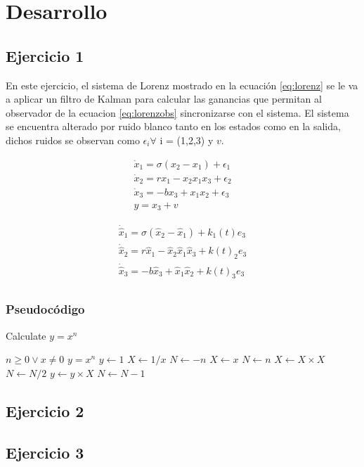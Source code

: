 \section*{Desarrollo}
\subsection*{Ejercicio 1}
En este ejercicio, el sistema de Lorenz mostrado en la ecuación \ref{eq:lorenz} se le va a aplicar un filtro de Kalman para calcular las ganancias que permitan al observador de la ecuacion \ref{eq:lorenzobs} sincronizarse con el sistema. El sistema se encuentra alterado por ruido blanco tanto en los estados como en la salida, dichos ruidos se observan como $\epsilon_i \forall$ i = (1,2,3) y $v$.

\begin{equation}\label{eq:lorenz}
\begin{array}{c}
\dot{x}_1 = \sigma ( x_2 - x_1 ) + \epsilon_1\\
\dot{x}_2 = rx_1 - x_2 x_1x_3 + \epsilon_2\\
\dot{x}_3 = -bx_3 + x_1x_2 + \epsilon_3\\
y = x_3 + v
\end{array}
\end{equation}

\begin{equation}\label{eq:lorenzobs}
\begin{array}{c}
\dot{\hat{x}}_1 = \sigma ( \hat{x}_2 - \hat{x}_1 ) + k_1(t)e_3\\
\dot{\hat{x}}_2 = r\hat{x}_1 - \hat{x}_2 \hat{x}_1\hat{x}_3 + k(t)_2e_3\\
\dot{\hat{x}}_3 = -b\hat{x}_3 + \hat{x}_1\hat{x}_2 + k(t)_3e_3\\
\end{array}
\end{equation}



\subsubsection*{Pseudocódigo}

\begin{algorithm}[H]
	\caption{Calculate $y = x^n$}
	\begin{algorithmic}
		\REQUIRE $n \geq 0 \vee x \neq 0$
		\ENSURE $y = x^n$
		\STATE $y \leftarrow 1$
		\STATE $X \leftarrow 1 / x$
		\STATE $N \leftarrow -n$
		\ELSE
		\STATE $X \leftarrow x$
		\STATE $N \leftarrow n$
		\ENDIF
		\STATE $X \leftarrow X \times X$
		\STATE $N \leftarrow N / 2$
		\ELSE[$N$ is odd]
		\STATE $y \leftarrow y \times X$
		\STATE $N \leftarrow N - 1$
		\ENDIF
		\ENDWHILE
	\end{algorithmic}
\end{algorithm}

\subsection*{Ejercicio 2}
\subsection*{Ejercicio 3}



